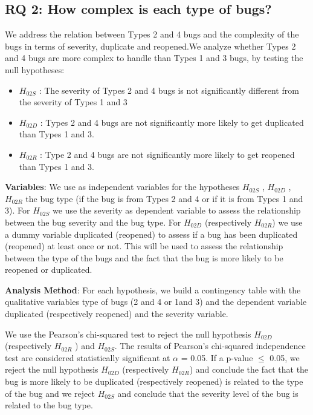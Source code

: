 \subsection{RQ 2: How complex is each type of bugs?}

We address the relation between Types 2 and 4 bugs and
the complexity of the bugs in terms of severity, duplicate and
reopened.We analyze whether Types 2 and 4 bugs are more
complex to handle than Types 1 and 3 bugs, by testing the
null hypotheses:

\begin{itemize}
 \item  $H_{02S}$ : The severity of Types 2 and 4 bugs is not
significantly different from the severity of Types 1 and 3
 \item  $H_{02D}$ : Types 2 and 4 bugs are not significantly more
likely to get duplicated than Types 1 and 3.
 \item  $H_{02R}$ : Type 2 and 4 bugs are not significantly more
likely to get reopened than Types 1 and 3.
\end{itemize}

{\bf Variables}: We use as independent variables for the
hypotheses $H_{02S}$ , $H_{02D}$ , $H_{02R}$ the bug type (if the bug is from
Types 2 and 4 or if it is from Types 1 and 3). For $H_{02S}$  we use
the severity as dependent variable to assess the relationship
between the bug severity and the bug type. For $H_{02D}$
(respectively $H_{02R}$) we use a dummy variable duplicated
(reopened) to assess if a bug has been duplicated (reopened)
at least once or not. This will be used to assess the
relationship between the type of the bugs and the fact that the
bug is more likely to be reopened or duplicated.

{\bf Analysis Method}: For each hypothesis, we build a
contingency table with the qualitative variables type of bugs
(2 and 4 or 1and 3) and the dependent variable duplicated
(respectively reopened) and the severity variable.

We use the Pearson’s chi-squared test to reject the null
hypothesis $H_{02D}$ (respectively $H_{02R}$ ) and $H_{02S}$. The results of
Pearson’s chi-squared independence test are considered
statistically significant at $\alpha$ = 0.05. If a p-value $\le$ 0.05, we
reject the null hypothesis  $H_{02D}$ (respectively $H_{02R}$) and
conclude the fact that the bug is more likely to be duplicated
(respectively reopened) is related to the type of the bug and
we reject $H_{02S}$ and conclude that the severity level of the bug
is related to the bug type.


